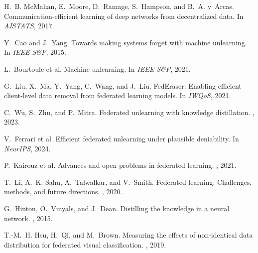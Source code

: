 \documentclass[10pt,twocolumn]{article}
\begin{document}
\begin{thebibliography}{10}

H.~B. McMahan, E.~Moore, D.~Ramage, S.~Hampson, and B.~A. y~Arcas.
\newblock Communication-efficient learning of deep networks from decentralized data.
\newblock In {\em AISTATS}, 2017.

Y.~Cao and J.~Yang.
\newblock Towards making systems forget with machine unlearning.
\newblock In {\em IEEE S\&P}, 2015.

L.~Bourtoule et al.
\newblock Machine unlearning.
\newblock In {\em IEEE S\&P}, 2021.

G.~Liu, X.~Ma, Y.~Yang, C.~Wang, and J.~Liu.
\newblock FedEraser: Enabling efficient client-level data removal from federated learning models.
\newblock In {\em IWQoS}, 2021.

C.~Wu, S.~Zhu, and P.~Mitra.
\newblock Federated unlearning with knowledge distillation.
, 2023.

V.~Ferrari et al.
\newblock Efficient federated unlearning under plausible deniability.
\newblock In {\em NeurIPS}, 2024.

P.~Kairouz et al.
\newblock Advances and open problems in federated learning.
, 2021.

T.~Li, A.~K. Sahu, A.~Talwalkar, and V.~Smith.
\newblock Federated learning: Challenges, methods, and future directions.
, 2020.

G.~Hinton, O.~Vinyals, and J.~Dean.
\newblock Distilling the knowledge in a neural network.
, 2015.

T.-M.~H. Hsu, H.~Qi, and M.~Brown.
\newblock Measuring the effects of non-identical data distribution for federated visual classification.
, 2019.

\end{thebibliography}
\end{document}
